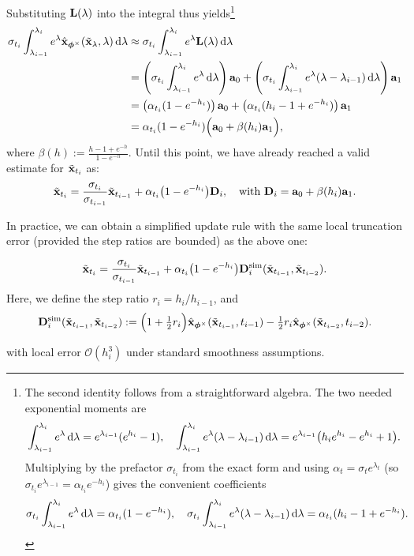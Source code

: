 Substituting ${\mathbf{L}}(\lambda)$ into the integral thus yields\footnote{The second identity follows from a straightforward algebra. The two needed exponential moments are
\[
\int_{\lambda_{i-1}}^{\lambda_i}  e^\lambda \mathop{}\!\mathrm{d}\lambda=e^{\lambda_{i-1}}(e^{h_i}-1),
\quad
\int_{\lambda_{i-1}}^{\lambda_i}  e^\lambda(\lambda-\lambda_{i-1}) \mathop{}\!\mathrm{d}\lambda
=e^{\lambda_{i-1}} \big(h_i e^{h_i}-e^{h_i}+1\big).
\]
Multiplying by the prefactor $\sigma_{t_i}$ from the exact form and using $\alpha_t=\sigma_t e^{\lambda_t}$ (so $\sigma_{t_i}e^{\lambda_{i-1}}=\alpha_{t_i}e^{-h_i}$) gives the convenient coefficients
\[
\sigma_{t_i} \int_{\lambda_{i-1}}^{\lambda_i} e^\lambda \mathop{}\!\mathrm{d}\lambda=\alpha_{t_i}(1-e^{-h_i}),
\quad
\sigma_{t_i} \int_{\lambda_{i-1}}^{\lambda_i} e^\lambda(\lambda-\lambda_{i-1}) \mathop{}\!\mathrm{d}\lambda=\alpha_{t_i}(h_i-1+e^{-h_i}).
\]}
\begin{align*}
\sigma_{t_i}\int_{\lambda_{i-1}}^{\lambda_i} e^\lambda \hat{{\mathbf{x}}}_{\bm{\phi}^\times}(\tilde{{\mathbf{x}}}_{\lambda},\lambda) \mathop{}\!\mathrm{d}\lambda
&\approx \sigma_{t_i}\int_{\lambda_{i-1}}^{\lambda_i} e^\lambda {\mathbf{L}}(\lambda) \mathop{}\!\mathrm{d}\lambda \\
&=\left(\sigma_{t_i}\int_{\lambda_{i-1}}^{\lambda_i} e^\lambda \mathop{}\!\mathrm{d}\lambda \right){\mathbf{a}}_0+\left(\sigma_{t_i}\int_{\lambda_{i-1}}^{\lambda_i} e^\lambda(\lambda-\lambda_{i-1}) \mathop{}\!\mathrm{d}\lambda \right) {\mathbf{a}}_1
\\&=\left(\alpha_{t_i}(1-e^{-h_i})\right){\mathbf{a}}_0+\left(\alpha_{t_i}(h_i-1+e^{-h_i}) \right) {\mathbf{a}}_1
\\&=\alpha_{t_i}(1-e^{-h_i})\Big({\mathbf{a}}_0+\beta(h_i)  {\mathbf{a}}_1\Big),
\end{align*}
where $\beta(h):=\frac{h-1+e^{-h}}{ 1-e^{-h} }$. Until this point, we have already reached a valid estimate for $\tilde{{\mathbf{x}}}_{t_i}$ as:
\begin{equation*}
\tilde{{\mathbf{x}}}_{t_i}
=
\frac{\sigma_{t_i}}{\sigma_{t_{i-1}}} \tilde{{\mathbf{x}}}_{t_{i-1}}
 + 
\alpha_{t_i} \big(1-e^{-h_i}\big) {\mathbf{D}}_i,\quad\text{with } {\mathbf{D}}_i={\mathbf{a}}_0+\beta(h_i)  {\mathbf{a}}_1.
\end{equation*}


In practice, we can obtain a simplified update rule with the same local truncation error (provided the step ratios are bounded) as the above one:

\begin{mdframed}
\begin{align*}
\begin{aligned}
    \tilde{{\mathbf{x}}}_{t_i}=
\frac{\sigma_{t_i}}{\sigma_{t_{i-1}}} \tilde{{\mathbf{x}}}_{t_{i-1}}
+ 
\alpha_{t_i} \big(1-e^{-h_i}\big) {\mathbf{D}}_i^{\mathrm{sim}}(\tilde{{\mathbf{x}}}_{t_{i-1}}, \tilde{{\mathbf{x}}}_{t_{i-2}}).
\end{aligned}
\end{align*}
Here, we define the step ratio $r_i=h_i/h_{i-1}$, and
\begin{align*}
    {\mathbf{D}}_i^{\mathrm{sim}}(\tilde{{\mathbf{x}}}_{t_{i-1}}, \tilde{{\mathbf{x}}}_{t_{i-2}})
:=\Big(1+\tfrac12 r_i\Big) \hat{{\mathbf{x}}}_{\bm{\phi}^\times}(\tilde{{\mathbf{x}}}_{t_{i-1}},t_{i-1})
-\tfrac12 r_i \hat{{\mathbf{x}}}_{\bm{\phi}^\times}(\tilde{{\mathbf{x}}}_{t_{i-2}},t_{i-2}).
\end{align*}
\end{mdframed}
with local error $\mathcal{O}(h_i^3)$ under standard smoothness assumptions. 

